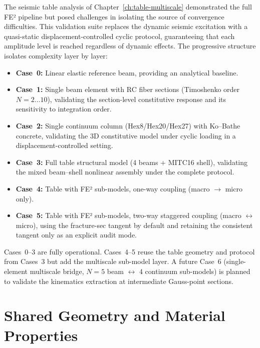 The seismic table analysis of Chapter~\ref{ch:table-multiscale}
demonstrated the full FE² pipeline but posed challenges in isolating
the source of convergence difficulties.  This validation suite
replaces the dynamic seismic excitation with a quasi-static
displacement-controlled cyclic protocol, guaranteeing that each
amplitude level is reached regardless of dynamic effects.  The
progressive structure isolates complexity layer by layer:

\begin{itemize}
  \item \textbf{Case~0:} Linear elastic reference beam,
    providing an analytical baseline.
  \item \textbf{Case~1:} Single beam element with RC fiber sections
    (Timoshenko order $N = 2\ldots10$), validating the section-level
    constitutive response and its sensitivity to integration order.
  \item \textbf{Case~2:} Single continuum column (Hex8/Hex20/Hex27)
    with Ko--Bathe concrete, validating the 3D constitutive model
    under cyclic loading in a displacement-controlled setting.
  \item \textbf{Case~3:} Full table structural model (4 beams +
    MITC16 shell), validating the mixed beam--shell nonlinear
    assembly under the complete protocol.
  \item \textbf{Case~4:} Table with FE² sub-models, one-way
    coupling (macro $\to$ micro only).
  \item \textbf{Case~5:} Table with FE² sub-models, two-way
    staggered coupling (macro $\leftrightarrow$ micro), using the
    fracture-sec tangent by default and retaining the consistent tangent
    only as an explicit audit mode.
\end{itemize}

\noindent
Cases~0--3 are fully operational.  Cases~4--5 reuse the table
geometry and protocol from Cases~3 but add the multiscale sub-model
layer.  A future Case~6 (single-element multiscale bridge, $N=5$
beam $\leftrightarrow$ 4 continuum sub-models) is planned to
validate the kinematics extraction at intermediate Gauss-point
sections.


\section{Shared Geometry and Material Properties}
\label{sec:cyclic-geometry}

